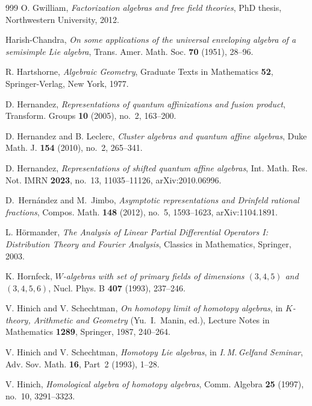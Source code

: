 \begin{thebibliography}{999}
O. Gwilliam, \emph{Factorization algebras and free field theories}, PhD thesis, Northwestern University, 2012.

Harish-Chandra, \emph{On some applications of the universal enveloping algebra of a semisimple Lie algebra}, Trans. Amer. Math. Soc. \textbf{70} (1951), 28--96.

R. Hartshorne, \emph{Algebraic Geometry}, Graduate Texts in Mathematics \textbf{52}, Springer-Verlag, New York, 1977.

D. Hernandez, \emph{Representations of quantum affinizations and fusion product}, Transform. Groups \textbf{10} (2005), no.~2, 163--200.

D. Hernandez and B. Leclerc, \emph{Cluster algebras and quantum affine algebras}, Duke Math. J. \textbf{154} (2010), no.~2, 265--341.

D. Hernandez, \emph{Representations of shifted quantum affine algebras}, Int. Math. Res. Not. IMRN \textbf{2023}, no.~13, 11035--11126, arXiv:2010.06996.

D.~Hern\'andez and M.~Jimbo, \emph{Asymptotic representations and Drinfeld rational fractions}, Compos. Math. \textbf{148} (2012), no.~5, 1593--1623, arXiv:1104.1891.

L. H\"ormander, \emph{The Analysis of Linear Partial Differential Operators I: Distribution Theory and Fourier Analysis}, Classics in Mathematics, Springer, 2003.

K. Hornfeck, \emph{$W$-algebras with set of primary fields of dimensions $(3,4,5)$ and $(3,4,5,6)$}, Nucl. Phys. B \textbf{407} (1993), 237--246.

V. Hinich and V. Schechtman, \emph{On homotopy limit of homotopy algebras}, in \emph{$K$-theory, Arithmetic and Geometry} (Yu.~I.~Manin, ed.), Lecture Notes in Mathematics \textbf{1289}, Springer, 1987, 240--264.

V. Hinich and V. Schechtman, \emph{Homotopy Lie algebras}, in \emph{I.\,M.\,Gelfand Seminar}, Adv. Sov. Math. \textbf{16}, Part~2 (1993), 1--28.

V. Hinich, \emph{Homological algebra of homotopy algebras}, Comm. Algebra \textbf{25} (1997), no.~10, 3291--3323.


\end{thebibliography}
